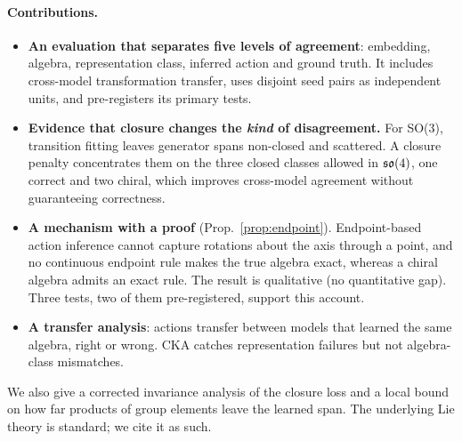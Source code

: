 \paragraph{Contributions.}
\begin{itemize}
\item \textbf{An evaluation that separates five levels of agreement}: embedding, algebra, representation class,
inferred action and ground truth. It includes cross-model transformation transfer, uses disjoint seed pairs as
independent units, and pre-registers its primary tests.
\item \textbf{Evidence that closure changes the \emph{kind} of disagreement.} For SO(3), transition fitting leaves
generator spans non-closed and scattered. A closure penalty concentrates them on the three closed classes allowed in
$\mathfrak{so}(4)$, one correct and two chiral, which improves cross-model agreement without guaranteeing correctness.
\item \textbf{A mechanism with a proof} (Prop.~\ref{prop:endpoint}). Endpoint-based action inference cannot capture
rotations about the axis through a point, and no continuous endpoint rule makes the true algebra exact, whereas a
chiral algebra admits an exact rule. The result is qualitative (no quantitative gap). Three tests, two of them
pre-registered, support this account.
\item \textbf{A transfer analysis}: actions transfer between models that learned the same algebra, right or wrong.
CKA catches representation failures but not algebra-class mismatches.
\end{itemize}
We also give a corrected invariance analysis of the closure loss and a local bound on how far products of group
elements leave the learned span. The underlying Lie theory is standard; we cite it as such.
